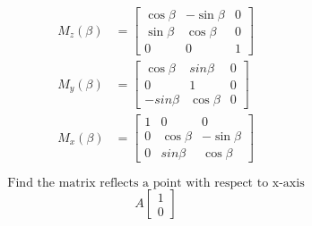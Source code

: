\documentclass[10pt]{article}
\begin{document}
\begin{equation}
\begin{aligned}
    M_{z}(\beta) & =\begin{bmatrix}
            \cos\beta & -\sin\beta & 0\\
            \sin\beta & \cos\beta & 0\\   
            0      &   0    & 1  
        \end{bmatrix} \\
    M_{y}(\beta) & =\begin{bmatrix}
            \cos \beta & sin\beta & 0\\
            0      &   1    & 0    \\  
            -sin\beta & \cos\beta & 0   
        \end{bmatrix} \\
    M_{x}(\beta) & =\begin{bmatrix}
            1 &   0      &     0   \\         
            0 & \cos\beta & -\sin\beta\\
            0 & sin\beta& \cos\beta   
        \end{bmatrix} 
\end{aligned}
\end{equation}

\[ \text{Find the matrix reflects a point with respect to x-axis} \]
\[
        A \left[ 
        \begin{array}{c}
        1\\
        0    
        \end{array}
        \right]
\]
\end{document}
